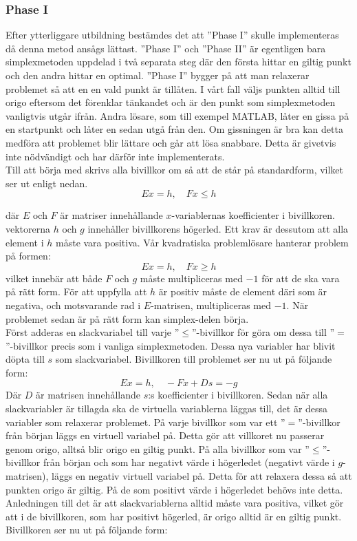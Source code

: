 \subsubsection{Phase I}
Efter ytterliggare utbildning bestämdes det att ''Phase I'' skulle implementeras då denna metod ansågs lättast. ''Phase I'' och ''Phase II'' är egentligen bara simplexmetoden uppdelad i två separata steg där den första hittar en giltig punkt och den andra hittar en optimal. ''Phase I'' bygger på att man relaxerar problemet så att en en vald punkt är tillåten. I vårt fall väljs punkten alltid till origo eftersom det förenklar tänkandet och är den punkt som simplexmetoden vanligtvis utgår ifrån. Andra lösare, som till exempel MATLAB, låter en gissa på en startpunkt och låter en sedan utgå från den. Om gissningen är bra kan detta medföra att problemet blir lättare och går att lösa snabbare. Detta är givetvis inte nödvändigt och har därför inte implementerats. \\
Till att börja med skrivs alla bivillkor om så att de står på standardform, vilket ser ut enligt nedan.
$$Ex = h, \quad Fx \leq h$$
\raggedright där $E$ och $F$ är matriser innehållande $x$-variablernas koefficienter i bivillkoren. vektorerna $h$ och $g$ innehåller bivillkorens högerled. Ett krav är dessutom att alla element i $h$ måste vara positiva.
Vår kvadratiska problemlösare hanterar problem på formen:
$$Ex = h, \quad Fx \geq h$$
vilket innebär att både $F$ och $g$ måste multipliceras med $-1$ för att de ska vara på rätt form. För att uppfylla att $h$ är positiv måste de element däri som är negativa, och motsvarande rad i $E$-matrisen, multipliceras med $-1$.
När problemet sedan är på rätt form kan simplex-delen börja. \\
Först adderas en slackvariabel till varje ''$\leq$''-bivillkor för göra om dessa till ''$=$''-bivillkor precis som i vanliga simplexmetoden. Dessa nya variabler har blivit döpta till $s$ som slackvariabel. Bivillkoren till problemet ser nu ut på följande form:
$$Ex = h, \quad -Fx+Ds = -g$$
Där $D$ är matrisen innehållande $s$:s koefficienter i bivillkoren.
Sedan när alla slackvariabler är tillagda ska de virtuella variablerna läggas till, det är dessa variabler som relaxerar problemet. På varje bivillkor som var ett ''$=$''-bivillkor från början läggs en virtuell variabel på. Detta gör att villkoret nu passerar genom origo, alltså blir origo en giltig punkt. På alla bivillkor som var ''$\leq$''-bivillkor från början och som har negativt värde i högerledet (negativt värde i $g$-matrisen), läggs en negativ virtuell variabel på. Detta för att relaxera dessa så att punkten origo är giltig. På de som positivt värde i högerledet behövs inte detta. Anledningen till det är att slackvariablerna alltid måste vara positiva, vilket gör att i de bivillkoren, som har positivt högerled, är origo alltid är en giltig punkt. Bivillkoren ser nu ut på följande form:
